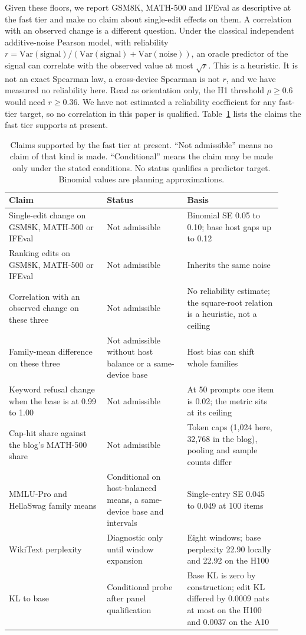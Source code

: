 Given these floors, we report GSM8K, MATH-500 and IFEval as descriptive at the fast tier and make no claim about single-edit effects on them. A correlation with an observed change is a different question. Under the classical independent additive-noise Pearson model, with reliability $r = \mathrm{Var}(\text{signal})/(\mathrm{Var}(\text{signal})+\mathrm{Var}(\text{noise}))$, an oracle predictor of the signal can correlate with the observed value at most $\sqrt{r}$. This is a heuristic. It is not an exact Spearman law, a cross-device Spearman is not $r$, and we have measured no reliability here. Read as orientation only, the H1 threshold $\rho \ge 0.6$ would need $r \ge 0.36$. We have not estimated a reliability coefficient for any fast-tier target, so no correlation in this paper is qualified. Table~\ref{tab:admissible} lists the claims the fast tier supports at present.
\begin{table}[t]
\centering
\begin{tabular}{>{\raggedright\arraybackslash}p{0.33\linewidth}>{\raggedright\arraybackslash}p{0.27\linewidth}>{\raggedright\arraybackslash}p{0.32\linewidth}}\toprule
Claim & Status & Basis \\\midrule
Single-edit change on GSM8K, MATH-500 or IFEval & Not admissible & Binomial SE 0.05 to 0.10; base host gaps up to 0.12 \\
Ranking edits on GSM8K, MATH-500 or IFEval & Not admissible & Inherits the same noise \\
Correlation with an observed change on these three & Not admissible & No reliability estimate; the square-root relation is a heuristic, not a ceiling \\
Family-mean difference on these three & Not admissible without host balance or a same-device base & Host bias can shift whole families \\
Keyword refusal change when the base is at 0.99 to 1.00 & Not admissible & At 50 prompts one item is 0.02; the metric sits at its ceiling \\
Cap-hit share against the blog's MATH-500 share & Not admissible & Token caps (1,024 here, 32,768 in the blog), pooling and sample counts differ \\
MMLU-Pro and HellaSwag family means & Conditional on host-balanced means, a same-device base and intervals & Single-entry SE 0.045 to 0.049 at 100 items \\
WikiText perplexity & Diagnostic only until window expansion & Eight windows; base perplexity 22.90 locally and 22.92 on the H100 \\
KL to base & Conditional probe after panel qualification & Base KL is zero by construction; edit KL differed by 0.0009 nats at most on the H100 and 0.0037 on the A10 \\\bottomrule
\end{tabular}
\caption{Claims supported by the fast tier at present. ``Not admissible'' means no claim of that kind is made. ``Conditional'' means the claim may be made only under the stated conditions. No status qualifies a predictor target. Binomial values are planning approximations.}
\label{tab:admissible}
\end{table}

